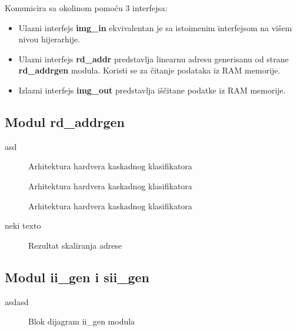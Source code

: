 Komunicira sa okolinom pomoću 3 interfejsa:
\begin{itemize}
  \item Ulazni interfejs \textbf{img\_in} ekvivalentan je sa istoimenim
    interfejsom na višem nivou hijerarhije.
  \item Ulazni interfejs \textbf{rd\_addr} predstavlja linearnu adresu
    generisanu od strane \textbf{rd\_addrgen} modula. Koristi se za čitanje
    podataka iz RAM memorije.
  \item Izlazni interfejs \textbf{img\_out} predstavlja iščitane podatke iz RAM memorije.
\end{itemize}

\subsection{Modul rd\_addrgen}

asd

\begin{figure}[H]
    
\caption{Arhitektura hardvera kaskadnog klasifikatora}
\label{rd_addrgen_bd}
\end{figure}

\begin{figure}[H]
  \centering
  \scalebox{0.82}{
    
    
    }
\caption{Arhitektura hardvera kaskadnog klasifikatora}
\label{hop_sweep1}
\end{figure}


\begin{figure}[H]
  \centering
  \scalebox{0.82}{
    
    
    }
\caption{Arhitektura hardvera kaskadnog klasifikatora}
\label{hop_sweep2}
\end{figure}

neki texto

\begin{figure}[H]
  \centering
  \scalebox{0.9}{
    
    }
\caption{Rezultat skaliranja adrese}
\label{hop_sweep_scale}
\end{figure}

\subsection{Modul ii\_gen i sii\_gen}
asdasd

\begin{figure}[H]
  \centering
  \scalebox{1.0}{
    
    }
\caption{Blok dijagram ii\_gen modula}
\label{ii\_gen}
\end{figure}

